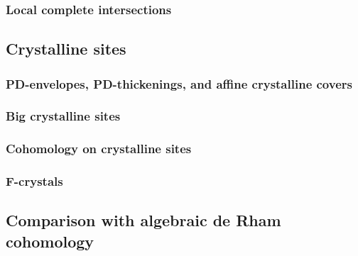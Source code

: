         \subsubsection{Local complete intersections}
        
    \subsection{Crystalline sites}
        \subsubsection{PD-envelopes, PD-thickenings, and affine crystalline covers}
            
        
        \subsubsection{Big crystalline sites}
        
        \subsubsection{Cohomology on crystalline sites}
        
        \subsubsection{F-crystals}
        
    \subsection{Comparison with algebraic de Rham cohomology}